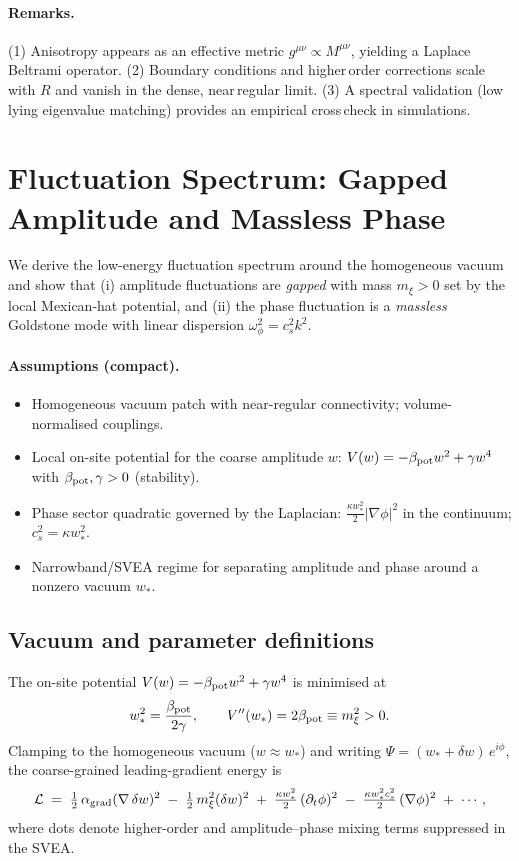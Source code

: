 \documentclass[11pt]{article}
\begin{document}
\paragraph{Remarks.} (1) Anisotropy appears as an effective metric $g^{\mu\nu}\propto M^{\mu\nu}$, yielding a Laplace\,Beltrami operator. (2) Boundary conditions and higher\,order corrections scale with $R$ and vanish in the dense, near\,regular limit. (3) A spectral validation (low\,lying eigenvalue matching) provides an empirical cross\,check in simulations.

\section{Fluctuation Spectrum: Gapped Amplitude and Massless Phase}\label{si:gapped-massless}
We derive the low-energy fluctuation spectrum around the homogeneous vacuum and show that (i) amplitude fluctuations are \emph{gapped} with mass $m_\xi>0$ set by the local Mexican-hat potential, and (ii) the phase fluctuation is a \emph{massless} Goldstone mode with linear dispersion $\omega_\phi^2=c_s^2 k^2$.

\paragraph{Assumptions (compact).}
\begin{itemize}[leftmargin=*]
  \item Homogeneous vacuum patch with near-regular connectivity; volume-normalised couplings.
  \item Local on-site potential for the coarse amplitude $w$: $V(w)=-\beta_{\rm pot} w^2 + \gamma w^4$ with $\beta_{\rm pot},\gamma>0$ (stability).
  \item Phase sector quadratic governed by the Laplacian: $\tfrac{\kappa w_*^2}{2}|\nabla\phi|^2$ in the continuum; $c_s^2=\kappa w_*^2$.
  \item Narrowband/SVEA regime for separating amplitude and phase around a nonzero vacuum $w_*$. 
\end{itemize}

\subsection*{Vacuum and parameter definitions}
The on-site potential $V(w)=-\beta_{\rm pot} w^2 + \gamma w^4$ is minimised at
\begin{equation}
  w_*^2 = \frac{\beta_{\rm pot}}{2\gamma}, \qquad V''(w_*) = 2\beta_{\rm pot} \equiv m_\xi^2 > 0.
\end{equation}
Clamping to the homogeneous vacuum ($w\approx w_*$) and writing $\Psi = (w_*+\delta w)\,e^{i\phi}$, the coarse-grained leading-gradient energy is
\begin{equation}
  \mathcal L \;=\; \tfrac{1}{2}\,\alpha_{\rm grad} (\nabla\,\delta w)^2 \; -\; \tfrac{1}{2}\, m_\xi^2 (\delta w)^2 \; +\; \tfrac{\kappa w_*^2}{2}\, (\partial_t\phi)^2 \; -\; \tfrac{\kappa w_*^2 c_s^2}{2}\, (\nabla\phi)^2 \; +\; \cdots,
\end{equation}
where dots denote higher-order and amplitude–phase mixing terms suppressed in the SVEA.
\end{document}

